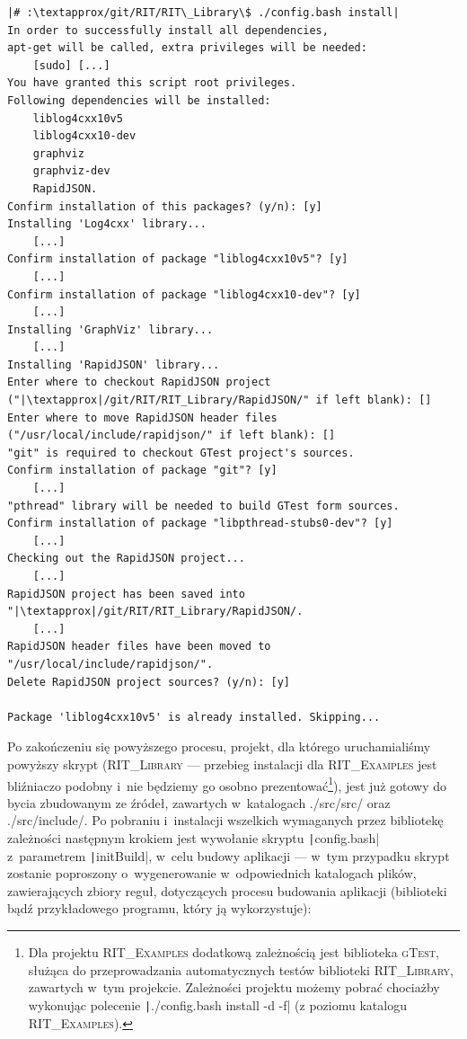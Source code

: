 \begin{verbatim}
|# :\textapprox/git/RIT/RIT\_Library\$ ./config.bash install|
In order to successfully install all dependencies,
apt-get will be called, extra privileges will be needed:
	[sudo] [...]
You have granted this script root privileges.
Following dependencies will be installed:
	liblog4cxx10v5
	liblog4cxx10-dev
	graphviz
	graphviz-dev
	RapidJSON.
Confirm installation of this packages? (y/n): [y]
Installing 'Log4cxx' library...
	[...]
Confirm installation of package "liblog4cxx10v5"? [y]
	[...]
Confirm installation of package "liblog4cxx10-dev"? [y]
	[...]
Installing 'GraphViz' library...
	[...]
Installing 'RapidJSON' library...
Enter where to checkout RapidJSON project ("|\textapprox|/git/RIT/RIT_Library/RapidJSON/" if left blank): []
Enter where to move RapidJSON header files ("/usr/local/include/rapidjson/" if left blank): []
"git" is required to checkout GTest project's sources.
Confirm installation of package "git"? [y]
	[...]
"pthread" library will be needed to build GTest form sources.
Confirm installation of package "libpthread-stubs0-dev"? [y]
	[...]
Checking out the RapidJSON project...
	[...]
RapidJSON project has been saved into "|\textapprox|/git/RIT/RIT_Library/RapidJSON/.
	[...]
RapidJSON header files have been moved to "/usr/local/include/rapidjson/".
Delete RapidJSON project sources? (y/n): [y]

Package 'liblog4cxx10v5' is already installed. Skipping...
\end{verbatim}

Po zakończeniu się powyższego procesu, projekt, dla którego uruchamialiśmy powyższy skrypt (\textsc{RIT\_Library} --- przebieg instalacji dla \textsc{RIT\_Examples} jest bliźniaczo podobny i~nie będziemy go osobno prezentować\footnote{Dla projektu \textsc{RIT\_Examples} dodatkową zależnością jest biblioteka \textsc{gTest}, służąca do przeprowadzania automatycznych testów biblioteki \textsc{RIT\_Library}, zawartych w~tym projekcie. Zależności projektu możemy pobrać chociażby wykonując polecenie \texttt|./config.bash install -d -f| (z poziomu katalogu \textsc{RIT\_Examples}).}), jest już gotowy do bycia zbudowanym ze źródeł, zawartych w~katalogach \textsf{./src/src/} oraz \textsf{./src/include/}. Po pobraniu i~instalacji wszelkich wymaganych przez bibliotekę zależności następnym krokiem jest wywołanie skryptu \texttt|config.bash| z~parametrem \texttt|initBuild|, w~celu budowy aplikacji --- w~tym przypadku skrypt zostanie poproszony o~wygenerowanie w~odpowiednich katalogach plików, zawierających zbiory reguł, dotyczących procesu budowania aplikacji (biblioteki bądź przykładowego programu, który ją wykorzystuje):


